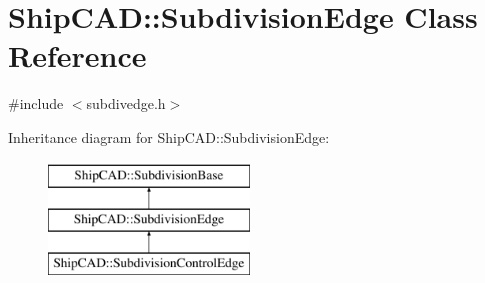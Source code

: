 \hypertarget{classShipCAD_1_1SubdivisionEdge}{\section{Ship\-C\-A\-D\-:\-:Subdivision\-Edge Class Reference}
\label{classShipCAD_1_1SubdivisionEdge}
}


{\ttfamily \#include $<$subdivedge.\-h$>$}

Inheritance diagram for Ship\-C\-A\-D\-:\-:Subdivision\-Edge\-:\begin{figure}[H]
\begin{center}
\leavevmode
\includegraphics[height=3.000000cm]{classShipCAD_1_1SubdivisionEdge}
\end{center}
\end{figure}

